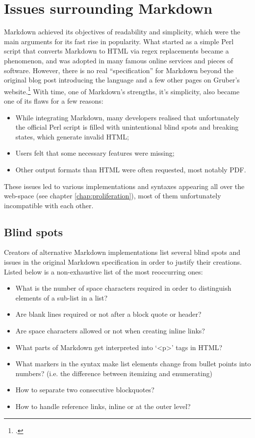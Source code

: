 \chapter{Issues surrounding Markdown}
\label{chap:issues}

\vspace{1cm}

Markdown achieved its objectives of readability and simplicity, which were the main arguments for its fast rise in popularity.
What started as a simple Perl script that converts Markdown to HTML via regex replacements became a phenomenon, and was adopted in many
famous online services and pieces of software. However, there is no real ``specification'' for Markdown beyond the original blog post
introducing the language and a few other pages on Gruber's website.\footcite{gruber2004markdown}
With time, one of Markdown's strengths, it's simplicity, also became one of its flaws for a few reasons:

\begin{itemize}
    \item While integrating Markdown, many developers realised that unfortunately the official Perl script is filled with unintentional
    blind spots and breaking states, which generate invalid HTML;
    \item Users felt that some necessary features were missing;
    \item Other output formats than HTML were often requested, most notably PDF.
\end{itemize}

These issues led to various implementations and syntaxes appearing all over the web-space (see chapter \ref{chap:proliferation}),
most of them unfortunately incompatible with each other.

\section{Blind spots}

Creators of alternative Markdown implementations list several blind spots and issues in the original Markdown specification in order to
justify their creations. Listed below is a non-exhaustive list of the most reoccurring ones:

\begin{itemize}
    \item What is the number of space characters required in order to distinguish elements of a sub-list in a list?
    \item Are blank lines required or not after a block quote or header?
    \item Are space characters allowed or not when creating inline links?
    \item What parts of Markdown get interpreted into `<p>' tags in HTML?
    \item What markers in the syntax make list elements change from bullet points into numbers? (i.e. the difference between itemizing
    and enumerating)
    \item How to separate two consecutive blockquotes?
    \item How to handle reference links, inline or at the outer level?
\end{itemize}


